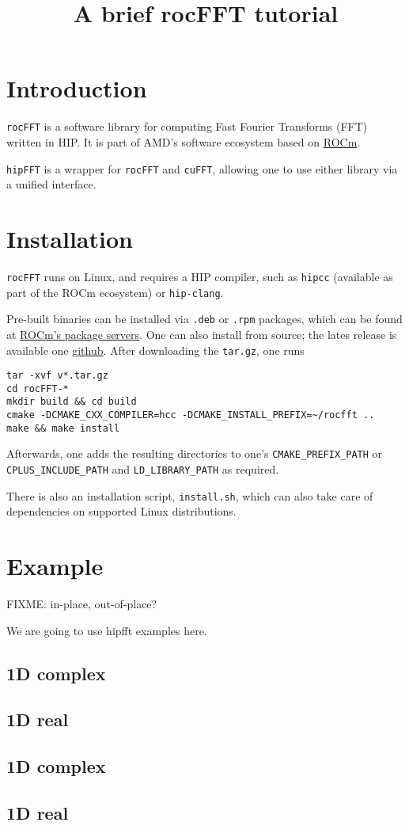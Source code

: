 \documentclass[12pt]{article}
\title{A brief rocFFT tutorial}
\renewcommand{\(}{\left(}
\renewcommand{\)}{\right)}
\begin{document}
\maketitle

\section{Introduction}

\texttt{rocFFT} is a software library for computing Fast Fourier
Transforms (FFT) written in HIP. It is part of AMD's software
ecosystem based on \href{https://github.com/RadeonOpenCompute}{ROCm}.

\texttt{hipFFT} is a wrapper for \texttt{rocFFT} and \texttt{cuFFT},
allowing one to use either library via a unified interface.

\section{Installation}

\texttt{rocFFT} runs on Linux, and requires a HIP compiler, such as
\texttt{hipcc} (available as part of the ROCm ecosystem) or
\texttt{hip-clang}.

Pre-built binaries can be installed via \texttt{.deb} or \texttt{.rpm}
packages, which can be found at
\href{https://rocm.github.io/install.html#installing-from-amd-rocm-repositories}{ROCm's
  package servers}.  One can also install from source; the lates
release is available one
\href{https://github.com/ROCmSoftwarePlatform/rocFFT/releases/latest}{github}.
After downloading the \texttt{tar.gz}, one runs
\begin{verbatim}
tar -xvf v*.tar.gz
cd rocFFT-*
mkdir build && cd build
cmake -DCMAKE_CXX_COMPILER=hcc -DCMAKE_INSTALL_PREFIX=~/rocfft ..
make && make install
\end{verbatim}
Afterwards, one adds the resulting directories to one's
\texttt{CMAKE_PREFIX_PATH} or \texttt{CPLUS_INCLUDE_PATH} and
\texttt{LD_LIBRARY_PATH} as required.

There is also an installation script, \texttt{install.sh}, which can
also take care of dependencies on supported Linux distributions.

\section{Example}

FIXME: in-place, out-of-place?

We are going to use hipfft examples here.

\subsection{1D complex}


\subsection{1D real}

\subsection{1D complex}


\subsection{1D real}
\end{document}
